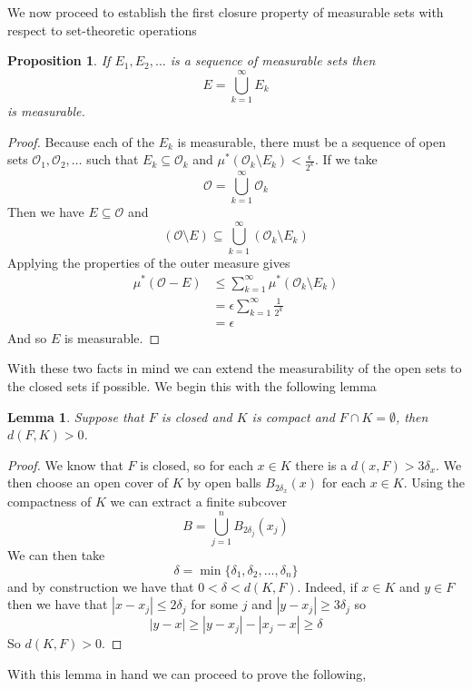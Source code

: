 \documentclass{article}
\newtheorem*{lem}{Lemma}
\newtheorem*{prop}{Proposition}
\begin{document}
We now proceed to establish the first closure property of measurable sets with respect to set-theoretic operations\\

\begin{prop}
If $E_1, E_2, \ldots$ is a sequence of measurable sets then
\[
E = \bigcup_{k = 1}^\infty E_k
\]
is measurable.
\end{prop}
\begin{proof}
Because each of the $E_k$ is measurable, there must be a sequence of open sets $\mathcal{O}_1, \mathcal{O}_2, \ldots$ such that $E_k \subseteq \mathcal{O}_k$ and $\mu^*(\mathcal{O}_k\setminus E_k) < \frac{\epsilon}{2^k}$. If we take 
\[
\mathcal{O} = \bigcup_{k=1}^\infty \mathcal{O}_k
\] 
Then we have $E \subseteq \mathcal{O}$ and 
\[
(\mathcal{O} \setminus E) \subseteq \bigcup_{k=1}^\infty (\mathcal{O}_k \setminus E_k)
\]
Applying the properties of the outer measure gives
\begin{align*}
\mu^*(\mathcal{O} - E) &\leq \sum_{k=1}^\infty \mu^*(\mathcal{O}_k\setminus E_k) \\
&= \epsilon\sum_{k=1}^\infty \frac{1}{2^k} \\
&= \epsilon
\end{align*}
And so $E$ is measurable.
\end{proof}

With these two facts in mind we can extend the measurability of the open sets to the closed sets if possible. We begin this with the following lemma \\

\begin{lem}
Suppose that $F$ is closed and $K$ is compact and $F \cap K = \emptyset$, then $d(F,K) > 0$.
\end{lem}
\begin{proof}
We know that $F$ is closed, so for each $x \in K$ there is a $d(x, F) > 3\delta_x$. We then choose an open cover of $K$ by open balls $B_{2\delta_x}(x)$ for each $x \in K$. Using the compactness of $K$ we can extract a finite subcover 
\[
B = \bigcup_{j = 1}^n B_{2\delta_j}(x_j)
\] 
We can then take 
\[
\delta = \min\{\delta_1, \delta_2, \ldots, \delta_n\}
\]
and by construction we have that $0 < \delta < d(K, F)$. Indeed, if $x\in K$ and $y \in F$ then we have that $|x - x_j| \leq 2\delta_j$ for some $j$ and $|y-x_j| \geq 3\delta_j$ so 
\[
|y-x| \geq |y - x_j| - |x_j - x| \geq \delta
\]
So $d(K,F) > 0$. 
\end{proof}

With this lemma in hand we can proceed to prove the following, \\
\end{document}
